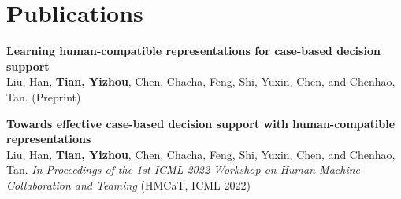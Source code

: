 
\section{Publications}



\textbf{Learning human-compatible representations for case-based decision support}
\href{https://drive.google.com/file/d/1Jo_UxAb69B-v5oqET8-qjzQIvDsXt-fF/view}
{\faExternalLink}\\
Liu, Han, \textbf{Tian, Yizhou}, Chen, Chacha, Feng, Shi, Yuxin, Chen, and Chenhao, Tan. (Preprint)
\vspace{1mm}
        

\textbf{Towards effective case-based decision support with human-compatible representations} 
\href{https://drive.google.com/file/d/1Jo_UxAb69B-v5oqET8-qjzQIvDsXt-fF/view}
{\faExternalLink}\\
Liu, Han, \textbf{Tian, Yizhou}, Chen, Chacha, Feng, Shi, Yuxin, Chen, and Chenhao, Tan. \textit{In Proceedings of the 1st ICML 2022 Workshop on Human-Machine Collaboration and Teaming} (HMCaT, ICML 2022) 
\vspace{1mm}
